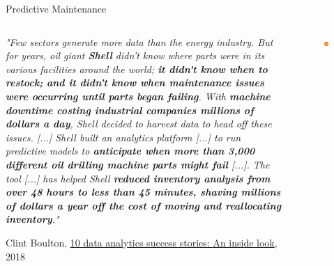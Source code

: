 \documentclass[main.tex]{subfiles}
\begin{document}
    \begin{frame}{Predictive Maintenance}
        \begin{columns}
            \begin{column}{.6\textwidth}
                \begin{justify}
                    \textit{"Few sectors generate more data than the energy industry. But for years, oil giant \textbf{Shell} didn't know where parts were in its various facilities around the world; \textbf{it didn’t know when to restock; and it didn't know when maintenance issues were occurring until parts began failing}. With \textbf{machine downtime costing industrial companies millions of dollars a day}, Shell decided to harvest data to head off these issues. [...] Shell built an analytics platform [...] to run predictive models to \textbf{anticipate when more than 3,000 different oil drilling machine parts might fail} [...]. The tool [...] has helped Shell \textbf{reduced inventory analysis from over 48 hours to less than 45 minutes, shaving millions of dollars a year off the cost of moving and reallocating inventory}."}
                    \vspace*{1mm}
                    
                    Clint Boulton, \href{https://medium.com/netflix-techblog/artwork-personalization-c589f074ad76}{10 data analytics success stories: An inside look}, 2018
                \end{justify}
            \end{column}
            \begin{column}{.4\textwidth}
                \begin{figure}
                    \label{fig:shell}
                    \includegraphics[width=0.8\textwidth]{figures/external/shell.png}
                \end{figure}
            \end{column}
        \end{columns}
    \end{frame}
    
\end{document}
